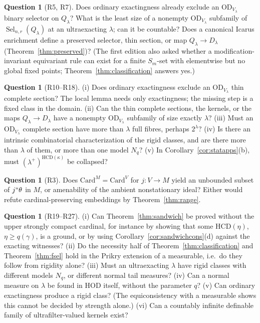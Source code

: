 \documentclass[11pt,letterpaper]{article}
\theoremstyle{definition}
\newtheorem{question}[definition]{Question}
\numberwithin{equation}{section}
\newcommand{\HOD}{\mathrm{HOD}}
\newcommand{\OD}{\mathrm{OD}}
\newcommand{\HCD}{\mathrm{HCD}}
\newcommand{\Sel}{\operatorname{Sel}}
\newcommand{\R}[1]{\textsf{R#1}}
\begin{document}
\begin{question}[\R5, \R7]
Does ordinary exactingness already exclude an $\OD_{V_\lambda}$ binary selector on $Q_\lambda$? What is the least size of a nonempty $\OD_{V_\lambda}$ subfamily of $\Sel_{n,r}(Q_\lambda)$ at an ultraexacting $\lambda$; can it be countable? Does a canonical Icarus enrichment define a preserved selector, thin section, or map $Q_\lambda\to D_\lambda$ (Theorem~\ref{thm:preserved})? (The first edition also asked whether a modification-invariant equivariant rule can exist for a finite $S_m$-set with elementwise but no global fixed points; Theorem~\ref{thm:classification} answers yes.)
\end{question}

\begin{question}[\R{10}--\R{18}]
(i) Does ordinary exactingness exclude an $\OD_{V_\lambda}$ thin complete section? The local lemma needs only exactingness; the missing step is a fixed class in the domain. (ii) Can the thin complete sections, the kernels, or the maps $Q_\lambda\to D_\lambda$ have a nonempty $\OD_{V_\lambda}$ subfamily of size exactly $\lambda$? (iii) Must an $\OD_{V_\lambda}$ complete section have more than $\lambda$ full fibres, perhaps $2^\lambda$? (iv) Is there an intrinsic combinatorial characterization of the rigid classes, and are there more than $\lambda$ of them, or more than one model $N_q$? (v) In Corollary~\ref{cor:statapps}(b), must $(\lambda^+)^{\HCD(\kappa)}$ be collapsed?
\end{question}

\begin{question}[\R3]
Does $\mathrm{Card}^M=\mathrm{Card}^V$ for $j:V\to M$ yield an unbounded subset of $j``\theta$ in $M$, or amenability of the ambient nonstationary ideal? Either would refute cardinal-preserving embeddings by Theorem~\ref{thm:range}.
\end{question}

\begin{question}[\R{19}--\R{27}]
(i) Can Theorem~\ref{thm:sandwich} be proved without the upper strongly compact cardinal, for instance by showing that some $\HCD(\eta)$, $\eta\ge q(\gamma)$, is a ground, or by using Corollary~\ref{cor:sandwichcons}(d) against the exacting witnesses? (ii) Do the necessity half of Theorem~\ref{thm:classification} and Theorem~\ref{thm:fsel} hold in the Prikry extension of a measurable, i.e.\ do they follow from rigidity alone? (iii) Must an ultraexacting $\lambda$ have rigid classes with different models $N_q$, or different normal tail measures? (iv) Can a normal measure on $\lambda$ be found in $\HOD$ itself, without the parameter $q$? (v) Can ordinary exactingness produce a rigid class? (The equiconsistency with a measurable shows this cannot be decided by strength alone.) (vi) Can a countably infinite definable family of ultrafilter-valued kernels exist?
\end{question}
\end{document}
